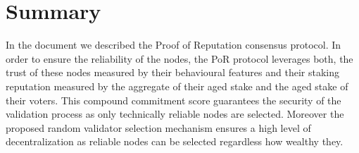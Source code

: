 \documentclass[]{article}
\begin{document}
\section{Summary}
\label{sec:conclusion}
In the document we described the Proof of Reputation consensus protocol. In order to ensure the reliability of the nodes, the PoR protocol leverages both, the trust of these nodes measured by their behavioural features and their staking reputation measured by the aggregate of their aged stake and the aged stake of their voters. This compound commitment score guarantees the security of the validation process as only technically reliable nodes are selected. Moreover the proposed random validator selection mechanism ensures a high level of decentralization as reliable nodes can be selected regardless how wealthy they. 





\end{document}
